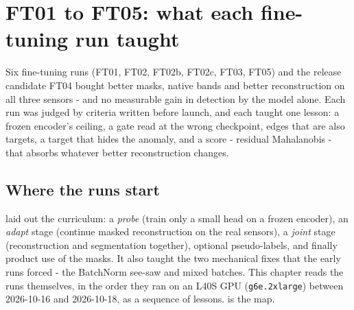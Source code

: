 \chapter{FT01 to FT05: what each fine-tuning run taught}\label{ch:ftruns}
\begingroup\sloppy %

\begin{onething}
Six fine-tuning runs (FT01, FT02, FT02b, FT02c, FT03, FT05) and the release candidate FT04 bought better masks,
native bands and better reconstruction on all three sensors - and no measurable gain in detection by the model
alone. Each run was judged by criteria written before launch, and each taught one lesson: a frozen encoder's
ceiling, a gate read at the wrong checkpoint, edges that are also targets, a target that hides the anomaly, and a
score - residual Mahalanobis - that absorbs whatever better reconstruction changes.
\end{onething}

\section{Where the runs start}\label{sec:ftruns:start}

 laid out the curriculum: a \emph{probe} (train only a small head on a frozen encoder), an
\emph{adapt} stage (continue masked reconstruction on the real sensors), a \emph{joint} stage (reconstruction and
segmentation together), optional pseudo-labels, and finally product use of the masks. It also taught the two
mechanical fixes that the early runs forced - the BatchNorm see-saw and mixed batches. This chapter reads the
runs themselves, in the order they ran on an L40S GPU (\texttt{g6e.2xlarge}) between 2026-10-16 and 2026-10-18,
as a sequence of lessons.  is the map.

